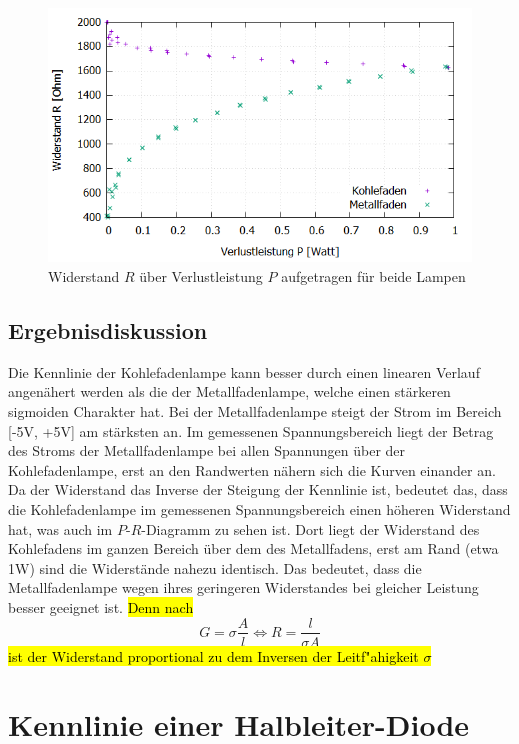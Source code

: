 \documentclass{scrartcl}
\begin{document}
\begin{figure}[H]
  \centering
    \includegraphics[scale=0.5]{V1_Leistung-Widerstand.PNG}
  \caption{Widerstand $R$ über Verlustleistung $P$ aufgetragen für beide Lampen}
  \label{fig:V1_Leistung-Widerstand}
\end{figure}
\subsection{Ergebnisdiskussion}
Die Kennlinie der Kohlefadenlampe kann besser durch einen linearen Verlauf angenähert werden als die der Metallfadenlampe, welche einen stärkeren sigmoiden Charakter hat. Bei der Metallfadenlampe steigt der Strom im Bereich [-5V, +5V] am stärksten an. Im gemessenen Spannungsbereich liegt der Betrag des Stroms der Metallfadenlampe bei allen Spannungen über der Kohlefadenlampe, erst an den Randwerten nähern sich die Kurven einander an. Da der Widerstand das Inverse der Steigung der Kennlinie ist, bedeutet das, dass die Kohlefadenlampe im gemessenen Spannungsbereich einen höheren Widerstand hat, was auch im $P$-$R$-Diagramm zu sehen ist. Dort liegt der Widerstand des Kohlefadens im ganzen Bereich über dem des Metallfadens, erst am Rand (etwa 1W) sind die Widerstände nahezu identisch. Das bedeutet, dass die Metallfadenlampe wegen ihres geringeren Widerstandes bei gleicher Leistung besser geeignet ist. \hl{Denn nach}
\begin{equation}
G=\sigma \frac{A}{l} \Leftrightarrow R=\frac{l}{\sigma A}
\end{equation}
 \hl{ist der Widerstand proportional zu dem Inversen der Leitf"ahigkeit $\sigma$}


\pagebreak
\section{Kennlinie einer Halbleiter-Diode}
\end{document}
